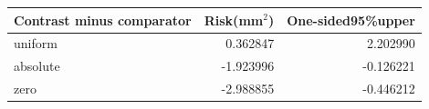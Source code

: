 \begin{tabular}{lrr}
\toprule
Contrast minus comparator & Risk(mm$^2$) & One-sided95\%upper\\
\midrule
uniform & 0.362847 & 2.202990\\
absolute & -1.923996 & -0.126221\\
zero & -2.988855 & -0.446212\\
\bottomrule
\end{tabular}
